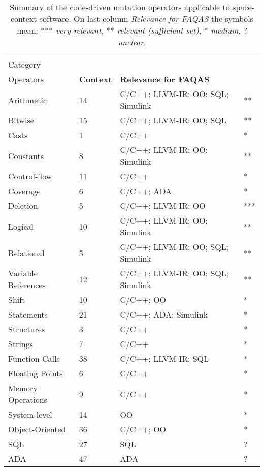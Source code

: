 


\setlength\LTleft{0pt}
\setlength\LTright{0pt}
\small 
\begin{longtable}{@{\extracolsep{\fill}}|l|l|l|l|@{}}
\caption{\normalsize Summary of the code-driven mutation operators applicable to space-context software. On last column \emph{Relevance for FAQAS} the symbols mean: *** \textit{very relevant}, ** \textit{relevant (sufficient set)}, * \textit{medium}, ? \textit{unclear}.}
\label{table:codeoperatorssummary} \\
\hline

	\textbf{\begin{tabular}[c]{@{}l@{}}Operator\\Category\end{tabular}}	&	\textbf{\begin{tabular}[c]{@{}l@{}}Number of\\Operators\end{tabular}}	&	\textbf{Context}	&	\textbf{Relevance for FAQAS}\\

\hline
	Arithmetic			&	14	&	C/C++; LLVM-IR; OO; SQL; Simulink	& **\\
	Bitwise				&	15	&	C/C++; LLVM-IR; OO; SQL 			& **\\
	Casts				&	1	&	C/C++ 								& *\\
	Constants			&	8	&	C/C++; LLVM-IR; OO; Simulink 		& **\\
	Control-flow		&	11	&	C/C++ & *\\
	Coverage			&	6	&	C/C++; ADA & *\\
	Deletion			&	5	&	C/C++; LLVM-IR; OO & ***\\
	Logical				&	10	&	C/C++; LLVM-IR; OO; Simulink & **\\
	Relational			&	5	&	C/C++; LLVM-IR; OO; SQL; Simulink & **\\
	Variable References	&	12	&	C/C++; LLVM-IR; OO; SQL; Simulink & **\\
	Shift				&	10	&	C/C++; OO & *\\
	Statements			&	21	&	C/C++; ADA; Simulink & *\\
	Structures			&	3	&	C/C++ & *\\
	Strings				&	7	&	C/C++ & *\\
	Function Calls		&	38	&	C/C++; LLVM-IR; SQL & *\\
	Floating Points		&	6	&	C/C++ & *\\
	Memory Operations	&	9	&	C/C++ & *\\
	System-level		&	14	&	OO & *\\
	Object-Oriented		&	36	&	C/C++; OO & *\\
	SQL					&	27	&	SQL & ?\\
	ADA					&	47	&	ADA & ?\\
\bottomrule                                                             
\end{longtable}
\normalsize